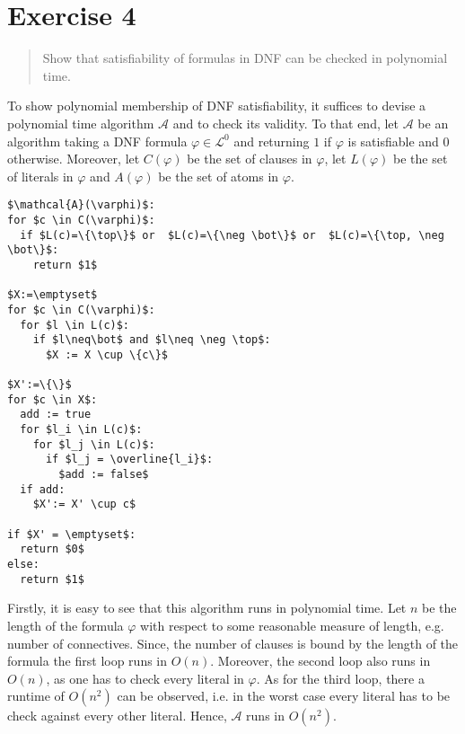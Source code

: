 \documentclass[11pt,a4paper]{article}
\begin{document}
\section*{Exercise 4}
\begin{quote}
Show that satisfiability of formulas in DNF can be checked in polynomial time.
\end{quote}
To show polynomial membership of DNF satisfiability, it suffices to devise a polynomial time algorithm $\mathcal{A}$ and to check its validity. To that end, let $\mathcal{A}$ be an algorithm taking a DNF formula $\varphi \in \mathcal{L}^0$ and returning $1$ if $\varphi$ is satisfiable and $0$ otherwise. Moreover, let $C(\varphi)$ be the set of clauses in $\varphi$, let $L(\varphi)$ be the set of literals in $\varphi$ and $A(\varphi)$ be the set of atoms in $\varphi$.

\begin{lstlisting}[mathescape=true]
$\mathcal{A}(\varphi)$:
for $c \in C(\varphi)$:
  if $L(c)=\{\top\}$ or  $L(c)=\{\neg \bot\}$ or  $L(c)=\{\top, \neg \bot\}$:
    return $1$
    
$X:=\emptyset$
for $c \in C(\varphi)$:
  for $l \in L(c)$:
    if $l\neq\bot$ and $l\neq \neg \top$:
      $X := X \cup \{c\}$
     
$X':=\{\}$ 
for $c \in X$:
  add := true
  for $l_i \in L(c)$:
    for $l_j \in L(c)$: 
      if $l_j = \overline{l_i}$:
        $add := false$
  if add:
    $X':= X' \cup c$
    
if $X' = \emptyset$:
  return $0$
else:
  return $1$
\end{lstlisting}

Firstly, it is easy to see that this algorithm runs in polynomial time. Let $n$ be the length of the formula $\varphi$ with respect to some reasonable measure of length, e.g. number of connectives. Since, the number of clauses is bound by the length of the formula the first loop runs in $O(n)$. Moreover, the second loop also runs in $O(n)$, as one has to check every literal in $\varphi$. As for the third loop, there a runtime of $O(n^2)$ can be observed, i.e. in the worst case every literal has to be check against every other literal. Hence, $\mathcal{A}$ runs in $O(n^2)$.
\end{document}
